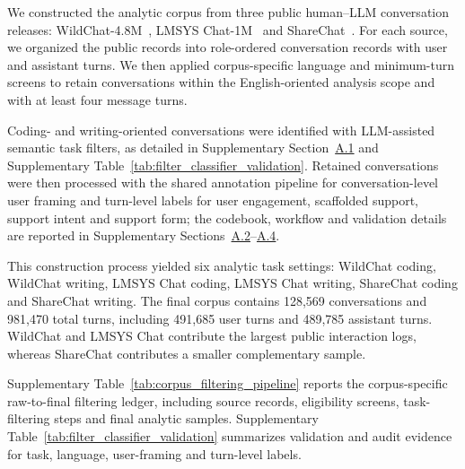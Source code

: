 We constructed the analytic corpus from three public human--LLM conversation releases: WildChat-4.8M~\cite{allenai2025wildchat48m,zhao2024wildchat}, LMSYS Chat-1M~\cite{zheng2023lmsyschat1m} and ShareChat~\cite{yan2025sharechat}. For each source, we organized the public records into role-ordered conversation records with user and assistant turns. We then applied corpus-specific language and minimum-turn screens to retain conversations within the English-oriented analysis scope and with at least four message turns.

Coding- and writing-oriented conversations were identified with LLM-assisted semantic task filters, as detailed in Supplementary Section~\hyperref[supp:a1]{A.1} and Supplementary Table~\ref{tab:filter_classifier_validation}. Retained conversations were then processed with the shared annotation pipeline for conversation-level user framing and turn-level labels for user engagement, scaffolded support, support intent and support form; the codebook, workflow and validation details are reported in Supplementary Sections~\hyperref[supp:a2]{A.2}--\hyperref[supp:a4]{A.4}.



This construction process yielded six analytic task settings: WildChat coding, WildChat writing, LMSYS Chat coding, LMSYS Chat writing, ShareChat coding and ShareChat writing. The final corpus contains 128,569 conversations and 981,470 total turns, including 491,685 user turns and 489,785 assistant turns. WildChat and LMSYS Chat contribute the largest public interaction logs, whereas ShareChat contributes a smaller complementary sample. 

Supplementary Table~\ref{tab:corpus_filtering_pipeline} reports the corpus-specific raw-to-final filtering ledger, including source records, eligibility screens, task-filtering steps and final analytic samples. Supplementary Table~\ref{tab:filter_classifier_validation} summarizes validation and audit evidence for task, language, user-framing and turn-level labels.








